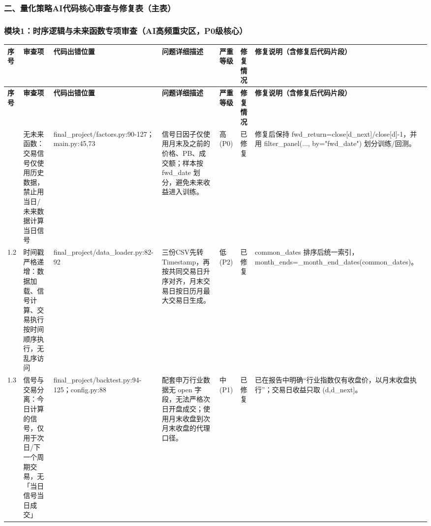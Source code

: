 \subsubsection*{二、量化策略AI代码核心审查与修复表（主表）}
\subsubsection*{模块1：时序逻辑与未来函数专项审查（AI高频重灾区，P0级核心）}
\begingroup
\tiny
\setlength{\tabcolsep}{1pt}
\renewcommand{\arraystretch}{1.16}
\begin{longtable}{@{}L{0.045\textwidth}L{0.190\textwidth}L{0.140\textwidth}L{0.190\textwidth}L{0.060\textwidth}L{0.060\textwidth}L{0.205\textwidth}@{}}
\toprule
\textbf{序号} & \textbf{审查项} & \textbf{代码出错位置} & \textbf{问题详细描述} & \textbf{严重等级} & \textbf{修复情况} & \textbf{修复说明（含修复后代码片段）} \\
\midrule
\endfirsthead
\toprule
\textbf{序号} & \textbf{审查项} & \textbf{代码出错位置} & \textbf{问题详细描述} & \textbf{严重等级} & \textbf{修复情况} & \textbf{修复说明（含修复后代码片段）} \\
\midrule
\endhead
\bottomrule
\endfoot
\bottomrule
{} & 无未来函数：交易信号仅使用历史数据，禁止用当日/\allowbreak{}未来数据计算当日信号 & final\_\allowbreak{}project/\allowbreak{}factors.py:90-127；main.py:45,73 & 信号日因子仅使用月末及之前的价格、PB、成交额；样本按 fwd\_\allowbreak{}date 划分，避免未来收益进入训练。 & 高(P0) & 已修复 & 修复后保持 fwd\_\allowbreak{}return=close[d\_\allowbreak{}next]/\allowbreak{}close[d]-1，并用 filter\_\allowbreak{}panel(..., by="fwd\_\allowbreak{}date") 划分训练/\allowbreak{}回测。 \\
1.2 & 时间戳严格递增：数据加载、信号计算、交易执行按时间顺序执行，无乱序访问 & final\_\allowbreak{}project/\allowbreak{}data\_\allowbreak{}loader.py:82-92 & 三份CSV先转 Timestamp，再按共同交易日升序对齐，月末交易日按日历月最大交易日生成。 & 低(P2) & 已修复 & common\_\allowbreak{}dates 排序后统一索引，month\_\allowbreak{}ends=\_\allowbreak{}month\_\allowbreak{}end\_\allowbreak{}dates(common\_\allowbreak{}dates)。 \\
1.3 & 信号与交易分离：今日计算的信号，仅用于次日/\allowbreak{}下一个周期交易，无「当日信号当日成交」 & final\_\allowbreak{}project/\allowbreak{}backtest.py:94-125；config.py:88 & 配套申万行业数据无 open 字段，无法严格次日开盘成交；使用月末收盘到次月末收盘的代理口径。 & 中(P1) & 已修复 & 已在报告中明确“行业指数仅有收盘价，以月末收盘执行”；交易日收益只取 (d,d\_\allowbreak{}next]。 \\

\end{longtable}
